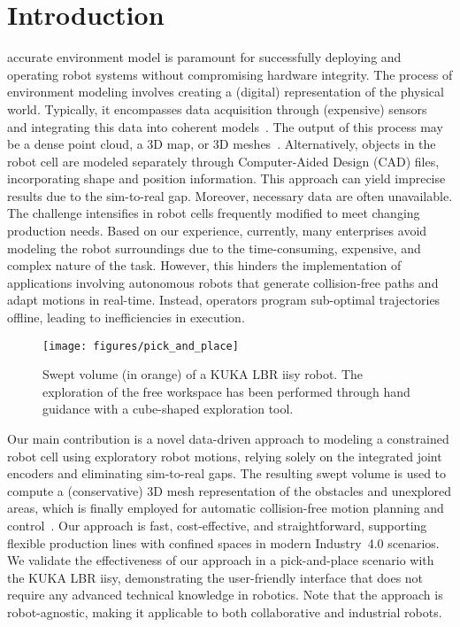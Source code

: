 \section{Introduction}
 accurate environment model 
is paramount for successfully deploying and operating robot systems without compromising hardware integrity. 
The process of environment modeling involves creating a (digital) representation of the physical world. 
Typically, 
it encompasses data acquisition through (expensive) sensors~\cite{campos2021orb} and integrating this data into coherent models~\cite{tateno2017cnn,bloesch2018codeslam}. 
The output of this process may be a dense point cloud, 
a 3D map, 
or 3D meshes~\cite{mildenhall2021nerf,kerbl20233d}.
Alternatively,
objects in the robot cell are modeled separately through Computer-Aided Design (CAD) files,
incorporating shape and position information.
This approach can yield imprecise results due to the sim-to-real gap. 
Moreover, 
necessary data are often unavailable.
The challenge intensifies in robot cells frequently modified to meet changing production needs.
Based on our experience, 
currently, 
many enterprises avoid modeling the robot surroundings due to the time-consuming, 
expensive, 
and complex nature of the task. 
However, 
this hinders the implementation of applications involving autonomous robots that generate collision-free paths and adapt motions in real-time. 
Instead, 
operators program sub-optimal trajectories offline,
leading to inefficiencies in execution.

\begin{figure}[!t]
	\centering
	\texttt{[image: figures/pick\_and\_place]}
	\caption{Swept volume (in orange) of a KUKA LBR iisy robot. The exploration of the free workspace has been performed through hand guidance with a cube-shaped exploration tool.}
	\label{fig:sv_pick_and_place}
\end{figure}

Our main contribution is a novel data-driven approach to modeling a constrained robot cell using exploratory robot motions,
relying solely on the integrated joint encoders and eliminating sim-to-real gaps.
The resulting swept volume is used to compute a (conservative) 3D mesh representation of the obstacles and unexplored areas, 
which is finally employed for automatic collision-free motion planning and control~\cite{osorio2020unilateral, fiore2023general}. 
Our approach is fast, cost-effective, and straightforward,
supporting flexible production lines with confined spaces in modern Industry~4.0 scenarios.
We validate the effectiveness of our approach in a pick-and-place scenario with the KUKA LBR iisy,
demonstrating the user-friendly interface that does not require 
any advanced technical knowledge in robotics. 
Note that the approach is robot-agnostic, 
making it applicable to both collaborative and industrial robots.


